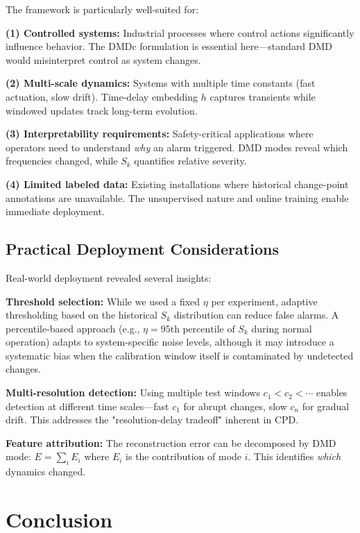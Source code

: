 \documentclass[conference]{IEEEtran}
\begin{document}
The framework is particularly well-suited for:

\textbf{(1) Controlled systems:} Industrial processes where control actions significantly influence behavior. The DMDc formulation is essential here—standard DMD would misinterpret control as system changes.

\textbf{(2) Multi-scale dynamics:} Systems with multiple time constants (fast actuation, slow drift). Time-delay embedding \(h\) captures transients while windowed updates track long-term evolution.

\textbf{(3) Interpretability requirements:} Safety-critical applications where operators need to understand \textit{why} an alarm triggered. DMD modes reveal which frequencies changed, while \(S_k\) quantifies relative severity.

\textbf{(4) Limited labeled data:} Existing installations where historical change-point annotations are unavailable. The unsupervised nature and online training enable immediate deployment.

\subsection{Practical Deployment Considerations}

Real-world deployment revealed several insights:

\textbf{Threshold selection:} While we used a fixed \(\eta\) per experiment, adaptive thresholding based on the historical \(S_k\) distribution can reduce false alarms. A percentile-based approach (e.g., \(\eta = \text{95th percentile of }S_k\) during normal operation) adapts to system-specific noise levels, although it may introduce a systematic bias when the calibration window itself is contaminated by undetected changes.

\textbf{Multi-resolution detection:} Using multiple test windows \(c_1 < c_2 < \cdots\) enables detection at different time scales—fast \(c_1\) for abrupt changes, slow \(c_n\) for gradual drift. This addresses the "resolution-delay tradeoff" inherent in CPD.

\textbf{Feature attribution:} The reconstruction error can be decomposed by DMD mode: \(E = \sum_i E_i\) where \(E_i\) is the contribution of mode \(i\). This identifies \textit{which} dynamics changed.

\section{Conclusion}\label{sec:conclusion}
\end{document}
